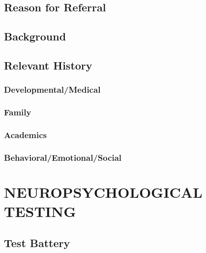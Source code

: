 \documentclass[%
numbers=noendperiod,
parskip=half,
bibliography=totoc,
DIV=calc,headsepline=true,
]{scrartcl}
\begin{document}
\hypertarget{reason-for-referral}{%
\subsection{Reason for Referral}\label{reason-for-referral}}

\hypertarget{background}{%
\subsection{Background}\label{background}}

\hypertarget{relevant-history}{%
\subsection{Relevant History}\label{relevant-history}}

\hypertarget{developmentalmedical}{%
\subsubsection{Developmental/Medical}\label{developmentalmedical}}

\hypertarget{family}{%
\subsubsection{Family}\label{family}}

\hypertarget{academics}{%
\subsubsection{Academics}\label{academics}}

\hypertarget{behavioralemotionalsocial}{%
\subsubsection{Behavioral/Emotional/Social}\label{behavioralemotionalsocial}}

\newpage

\hypertarget{neuropsychological-testing}{%
\section{NEUROPSYCHOLOGICAL TESTING}\label{neuropsychological-testing}}

\hypertarget{test-battery}{%
\subsection{Test Battery}\label{test-battery}}
\end{document}
